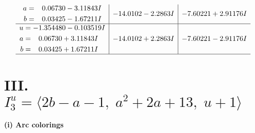 \documentclass[1p]{elsarticle_modified}
\theoremstyle{definition}
\begin{document}
$$\begin{array}{c|c|c}
\begin{aligned}
a &= \phantom{-}0.06730 - 3.11843 I \\
b &= \phantom{-}0.03425 - 1.67211 I\end{aligned}
 & -14.0102 - 2.2863 I & -7.60221 + 2.91176 I \\ \hline\begin{aligned}
u &= -1.354480 - 0.103519 I \\
a &= \phantom{-}0.06730 + 3.11843 I \\
b &= \phantom{-}0.03425 + 1.67211 I\end{aligned}
 & -14.0102 + 2.2863 I & -7.60221 - 2.91176 I\\
 \hline 
 \end{array}$$\newpage\newpage\renewcommand{\arraystretch}{1}
\centering \section*{III. $I^u_{3}= \langle 2 b- a-1,\;a^2+2 a+13,\;u+1 \rangle$}
\flushleft \textbf{(i) Arc colorings}\\
\end{document}
